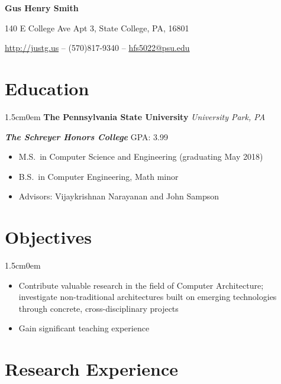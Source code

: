 \documentclass[letterpaper]{article}
\newcommand{\primaryindent}{1.5cm} %
\newcommand{\name}[1]{ 
	\Huge  \textsf{\textbf{#1}}
	\vspace{0.1em}
	\par \normalsize \normalfont}
\newcommand{\personalinfo}[1]{
	\large  #1 
	\par \normalsize \normalfont}
\newenvironment{indented}{\begin{adjustwidth}{\primaryindent}{0em}}{\end{adjustwidth}}
\newenvironment{resumelist}{\begin{itemize}[topsep=0pt,noitemsep,itemindent=-15pt,leftmargin=30pt]}{\end{itemize}}
\newcommand{\generalentry}[5]{
	\begin{indented}
		\Large \textsf{\textbf{#1}} \hfill	%
			\hfill\normalsize\textit{#2} \par  			%
		\noindent \large \textsf{\textbf{\textit{#3}}} 	%
			\hfill \normalsize #4\par 					%
		\normalsize \normalfont #5 \par					%
		\normalsize \normalfont
	\end{indented}
	}
\begin{document}
	
	
\begin{center}
	\name{Gus Henry Smith}
	\personalinfo{140 E College Ave Apt 3, State College, PA, 16801}
	\personalinfo{\url{http://justg.us} -- (570)817-9340 -- \href{mailto:hfs5022@psu.edu}{hfs5022@psu.edu}}
\end{center}

\section*{Education}
\generalentry{The Pennsylvania State University}{University Park, PA}{The Schreyer Honors College}{GPA: 3.99}{
	\begin{resumelist}
		\item M.S.\ in Computer Science and Engineering (graduating May 2018)
		\item B.S.\ in Computer Engineering, Math minor
		\item Advisors: Vijaykrishnan Narayanan and John Sampson
	\end{resumelist}
}

\section*{Objectives}
\begin{indented}
\begin{resumelist}
	\item Contribute valuable research in the field of Computer Architecture; investigate non-traditional architectures built on emerging technologies through concrete, cross-disciplinary projects 
	\item Gain significant teaching experience
\end{resumelist}
\end{indented}

\section*{Research Experience}
\end{document}
